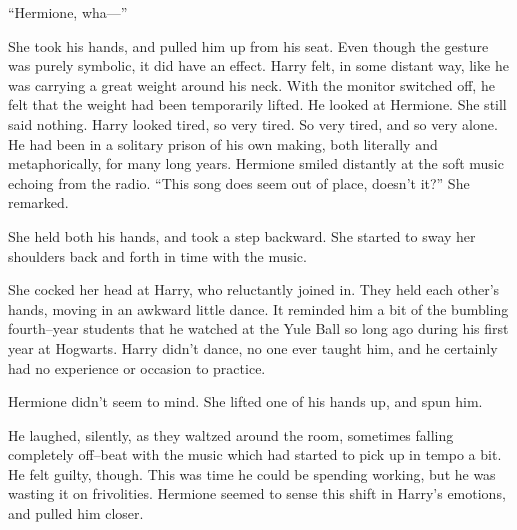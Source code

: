 “Hermione, wha\mbox{---}”

She took his hands, and pulled him up from his seat. Even though the gesture was purely symbolic, it did have an effect. Harry felt, in some distant way, like he was carrying a great weight around his neck. With the monitor switched off, he felt that the weight had been temporarily lifted. He looked at Hermione.
\SmallVSpace
She still said nothing. Harry looked tired, so very tired. So very tired, and so very alone. He had been in a solitary prison of his own making, both literally and metaphorically, for many long years. Hermione smiled distantly at the soft music echoing from the radio.
\SmallVSpace
“This song does seem out of place, doesn’t it?” She remarked.


She held both his hands, and took a step backward. She started to sway her shoulders back and forth in time with the music.


She cocked her head at Harry, who reluctantly joined in. They held each other’s hands, moving in an awkward little dance. It reminded him a bit of the bumbling fourth\mbox{--}year students that he watched at the Yule Ball so long ago during his first year at Hogwarts. Harry didn’t dance, no one ever taught him, and he certainly had no experience or occasion to practice.

Hermione didn’t seem to mind. She lifted one of his hands up, and spun him.


He laughed, silently, as they waltzed around the room, sometimes falling completely off\mbox{--}beat with the music which had started to pick up in tempo a bit. He felt guilty, though. This was time he could be spending working, but he was wasting it on frivolities. Hermione seemed to sense this shift in Harry’s emotions, and pulled him closer.



